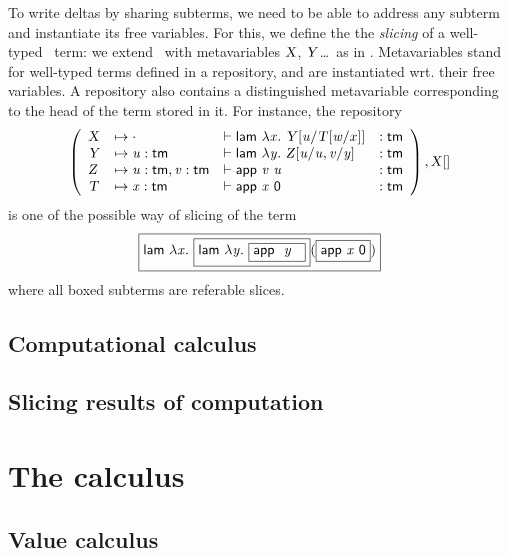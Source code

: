 \documentclass[9pt]{sigplanconf}
\begin{document}
To write deltas by sharing subterms, we need to be able to address any
subterm and instantiate its free variables. For this, we define the
the \emph{slicing} of a well-typed \LF\ term: we extend \LF\ with
metavariables $\meta X$, $\meta Y$\ldots\ as in
\cite{nanevski2008contextual}. Metavariables stand for well-typed
terms defined in a repository, and are instantiated wrt. their free
variables. A repository also contains a distinguished metavariable
corresponding to the head of the term stored in it. For instance, the
repository
$$
\left(\begin{array}{llll}
    \meta X &\mapsto
    \envnil&\vdash
    \app{\cst{lam}} \lam x \smeta Y {\msubst u {\smeta T {\msubst w x}}} &:
    \cst{tm}
    \\
    \meta Y &\mapsto
    \env u {\cst{tm}} &\vdash
    \app{\cst{lam}} \lam y \smeta Z {\msubstcons {\msubst u
      {\var u}} v {\var y} } &:
    \cst{tm}
    \\
    \meta Z &\mapsto
    \envcons {\env u {\cst{tm}}} v {\cst{tm}} &\vdash
    \app{\app{\cst{app}}{\var v}}{\var u} &:
    \cst{tm}
    \\
    \meta T &\mapsto
    \env x {\cst{tm}} &\vdash
    \app{\cst{app}}\app{\var x}{\cst{0}} &:
    \cst{tm}

\end{array}\right), \smeta X {}
$$
is one of the possible way of slicing of the term
$$
\fbox{$\app {\cst{lam}} \lam x
\fbox{$\app {\cst{lam}} \lam y
\fbox{\app {\cst{app}} \app {\var y}
}$}
{(\fbox{\app
  {\cst{app}}\app{\var x}{\cst 0}})
}
$}$$
where all boxed subterms are referable slices.

\subsection{Computational calculus}
\subsection{Slicing results of computation}

\section{The calculus}

\subsection{Value calculus}
\end{document}
